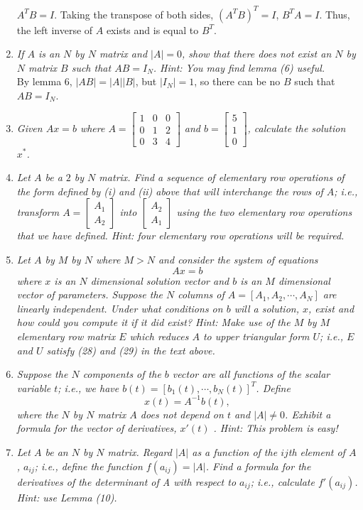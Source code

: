 \documentclass[10pt]{article}
\begin{document}
\begin{enumerate}
  $A^T B = I$. Taking the transpose of both sides, $(A^T B)^T = I$,
  $B^T A = I$. Thus, the left inverse of $A$ exists and is equal to
  $B^T$. 
\item \textit{If $A$ is an $N$ by $N$ matrix and $|A| = 0$, show that there
    does not exist an $N$ by $N$ matrix $B$ such that $AB = I_N$.  Hint:
    You may find lemma (6) useful.} \\
  By lemma 6, $|AB| = |A||B|$, but $|I_N| = 1$, so there can be no $B$
  such that $AB = I_N$.
\item \textit{Given $Ax  =  b$  where   
  $A = \begin{bmatrix}
    1 & 0 & 0 \\
    0 & 1 & 2 \\
    0 & 3 & 4
  \end{bmatrix}$ and $b = \begin{bmatrix} 5 \\ 1 \\ 0 \end{bmatrix}$,
  calculate the solution $x^*$.} 
\item \textit{Let $A$ be a $2$ by $N$ matrix.  Find a sequence of elementary
    row operations of the form defined by (i) and (ii) above that will
    interchange the rows of $A$; i.e., transform $A = \begin{bmatrix}
      A_1 \\ A_2 \end{bmatrix}$ into $\begin{bmatrix} A_2 \\
      A_1 \end{bmatrix}$ using the two elementary row operations that we
    have defined.  Hint: four elementary row operations will be
    required.} 
\item \textit{Let $A$ by $M$ by $N$ where $M > N $ and consider the system of
  equations}
  \[
  Ax = b
  \]
  \textit{where $x$ is an $N$ dimensional solution vector and $b$ is an $M$
  dimensional vector of parameters.  Suppose the $N$ columns of $A =
  [A_1 ,A_2 ,\cdots,A_N]$ are linearly independent.  Under what
  conditions on $b$ will a solution, $x$, exist and how could you
  compute it if it did exist?  Hint: Make use of the $M$ by $M$
  elementary row matrix $E$ which reduces $A$ to upper triangular form
  $U$; i.e., $E$ and $U$ satisfy (28) and (29) in the text above.}
\item \textit{Suppose the $N$ components of the $b$ vector are all functions
    of the scalar variable $t$; i.e., we have $b(t) = [b_1(t),\cdots,
    b_N(t)]^T$.  Define }
  \[ x(t) = A^{-1} b(t), \] 
  \textit{where the $N$ by $N$ matrix $A$ does not
    depend on $t$ and $|A|\neq 0$.  Exhibit a formula for the vector of
    derivatives, $x'(t)$ .  Hint:  This problem is easy!}
\item \textit{Let $A$ be an $N$ by $N$ matrix.  Regard $|A|$ as a
    function of the $ij$th element of $A$, $a_{ij}$; i.e., define the
    function $f(a_{ij}) = |A|$.  Find a formula for the derivatives of
    the determinant of A with respect to $a_{ij}$; i.e., calculate
    $f'(a_{ij})$.  Hint: use Lemma (10).}
\end{enumerate}
\end{document}
